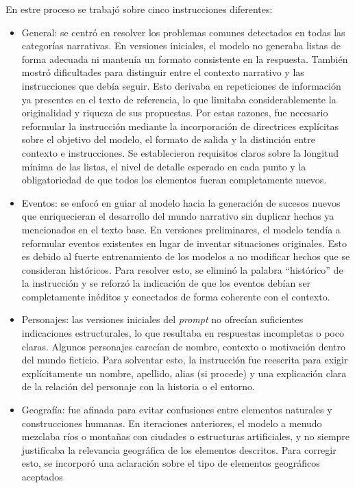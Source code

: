 \pagebreak
En estre proceso se trabajó sobre cinco instrucciones diferentes:
\begin{itemize}
\item General:
se centró en resolver los problemas comunes detectados en todas las categorías narrativas.
En versiones iniciales, el modelo no generaba listas de forma adecuada ni mantenía un formato consistente en la respuesta.
También mostró dificultades para distinguir entre el contexto narrativo y las instrucciones que debía seguir.
Esto derivaba en repeticiones de información ya presentes en el texto de referencia, lo que limitaba considerablemente
la originalidad y riqueza de sus propuestas.
Por estas razones, fue necesario reformular la instrucción 
mediante la incorporación de directrices explícitas sobre el objetivo del modelo,
el formato de salida y la distinción entre contexto e instrucciones.
Se establecieron requisitos claros sobre la longitud mínima de las listas,
el nivel de detalle esperado en cada punto
y la obligatoriedad de que todos los elementos fueran completamente nuevos.
\item Eventos:
se enfocó en guiar al modelo
hacia la generación de sucesos nuevos que enriquecieran el desarrollo del mundo narrativo
sin duplicar hechos ya mencionados en el texto base.
En versiones preliminares, el modelo tendía a reformular eventos existentes en lugar de inventar situaciones originales.
Esto es debido al fuerte entrenamiento de los modelos a no modificar hechos que se consideran históricos.
Para resolver esto, se eliminó la palabra ``histórico'' de la instrucción y
se reforzó la indicación de que los eventos debían ser completamente inéditos
y conectados de forma coherente con el contexto.
\item Personajes:
las versiones iniciales del \textit{prompt} no ofrecían suficientes indicaciones estructurales,
lo que resultaba en respuestas incompletas o poco claras.
Algunos personajes carecían de nombre, contexto o motivación dentro del mundo ficticio.
Para solventar esto, la instrucción fue reescrita para exigir explícitamente un nombre, apellido,
alias (si procede) y una explicación clara de la relación del personaje con la historia o el entorno.
\item Geografía:
fue afinada para evitar confusiones entre elementos naturales y construcciones humanas.
En iteraciones anteriores, el modelo a menudo mezclaba ríos o montañas con ciudades o estructuras artificiales,
y no siempre justificaba la relevancia geográfica de los elementos descritos.
Para corregir esto, se incorporó una aclaración sobre el tipo de elementos geográficos aceptados

\end{itemize}
